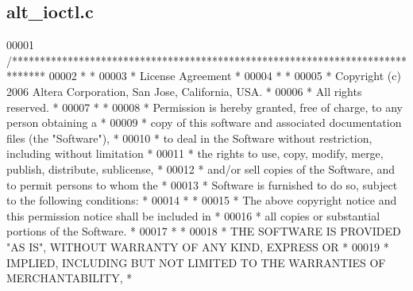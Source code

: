 \subsection{alt\+\_\+ioctl.\+c}
\label{alt__ioctl_8c_source}

\begin{DoxyCode}
00001 \textcolor{comment}{/******************************************************************************}
00002 \textcolor{comment}{*                                                                             *}
00003 \textcolor{comment}{* License Agreement                                                           *}
00004 \textcolor{comment}{*                                                                             *}
00005 \textcolor{comment}{* Copyright (c) 2006 Altera Corporation, San Jose, California, USA.           *}
00006 \textcolor{comment}{* All rights reserved.                                                        *}
00007 \textcolor{comment}{*                                                                             *}
00008 \textcolor{comment}{* Permission is hereby granted, free of charge, to any person obtaining a     *}
00009 \textcolor{comment}{* copy of this software and associated documentation files (the "Software"),  *}
00010 \textcolor{comment}{* to deal in the Software without restriction, including without limitation   *}
00011 \textcolor{comment}{* the rights to use, copy, modify, merge, publish, distribute, sublicense,    *}
00012 \textcolor{comment}{* and/or sell copies of the Software, and to permit persons to whom the       *}
00013 \textcolor{comment}{* Software is furnished to do so, subject to the following conditions:        *}
00014 \textcolor{comment}{*                                                                             *}
00015 \textcolor{comment}{* The above copyright notice and this permission notice shall be included in  *}
00016 \textcolor{comment}{* all copies or substantial portions of the Software.                         *}
00017 \textcolor{comment}{*                                                                             *}
00018 \textcolor{comment}{* THE SOFTWARE IS PROVIDED "AS IS", WITHOUT WARRANTY OF ANY KIND, EXPRESS OR  *}
00019 \textcolor{comment}{* IMPLIED, INCLUDING BUT NOT LIMITED TO THE WARRANTIES OF MERCHANTABILITY,    *}

\end{DoxyCode}
